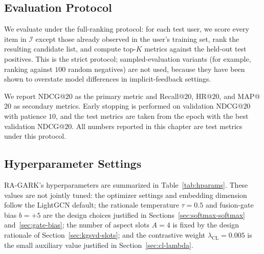 \subsection{Evaluation Protocol}
\label{sec:eval-protocol}

We evaluate under the full-ranking protocol: for each test user, we score every item in $\mathcal{I}$ except those already observed in the user's training set, rank the resulting candidate list, and compute top-$K$ metrics against the held-out test positives. This is the strict protocol; sampled-evaluation variants (for example, ranking against $100$ random negatives) are not used, because they have been shown to overstate model differences in implicit-feedback settings.

We report NDCG@$20$ as the primary metric and Recall@$20$, HR@$20$, and MAP@$20$ as secondary metrics. Early stopping is performed on validation NDCG@$20$ with patience $10$, and the test metrics are taken from the epoch with the best validation NDCG@$20$. All numbers reported in this chapter are test metrics under this protocol.

\subsection{Hyperparameter Settings}
\label{sec:eval-hparams}

RA-GARK's hyperparameters are summarized in Table~\ref{tab:hparams}. These values are not jointly tuned: the optimizer settings and embedding dimension follow the LightGCN default; the rationale temperature $\tau = 0.5$ and fusion-gate bias $b = +5$ are the design choices justified in Sections~\ref{sec:softmax-softmax} and~\ref{sec:gate-bias}; the number of aspect slots $A = 4$ is fixed by the design rationale of Section~\ref{sec:kgsvd-slots}; and the contrastive weight $\lambda_{\mathrm{CL}} = 0.005$ is the small auxiliary value justified in Section~\ref{sec:cl-lambda}.

